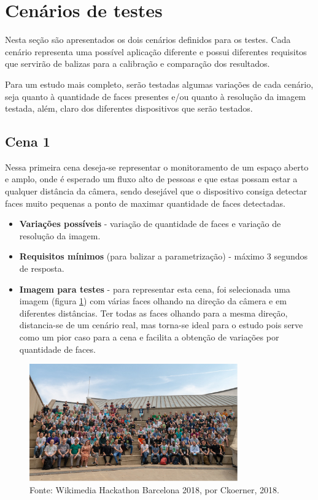 \section{Cenários de testes}

Nesta seção são apresentados os dois cenários definidos para os testes. Cada cenário representa uma possível aplicação diferente e possui diferentes requisitos que servirão de balizas para a calibração e comparação dos resultados.

Para um estudo mais completo, serão testadas algumas variações de cada cenário, seja quanto à quantidade de faces presentes e/ou quanto à resolução da imagem testada, além, claro dos diferentes dispositivos que serão testados.

\subsection{Cena 1}

Nessa primeira cena deseja-se representar o monitoramento de um espaço aberto e amplo, onde é esperado um fluxo alto de pessoas e que estas possam estar a qualquer distância da câmera, sendo desejável que o dispositivo consiga detectar faces muito pequenas a ponto de maximar quantidade de faces detectadas.

\begin{itemize}
    \item \textbf{Variações possíveis} - variação de quantidade de faces e variação de resolução da imagem.
    \item \textbf{Requisitos mínimos} (para balizar a parametrização) - máximo 3 segundos de resposta.
    \item \textbf{Imagem para testes} - para representar esta cena, foi selecionada uma imagem (figura \ref{fig:imagemCena1}) com várias faces olhando na direção da câmera e em diferentes distâncias. Ter todas as faces olhando para a mesma direção, distancia-se de um cenário real, mas torna-se ideal para o estudo pois serve como um pior caso para a cena e facilita a obtenção de variações por quantidade de faces.
\end{itemize}

\begin{figure}[H]
    \centering
    \caption[Imagem selecionada para testes da cena 1.]{Imagem selecionada para testes da cena 1.}
    \includegraphics[width=0.8\textwidth]{Cap3_Desenvolvimento/Figures/imagem_cena1.jpg}
    \caption*{Fonte: Wikimedia Hackathon Barcelona 2018, por Ckoerner, 2018\footnotemark.}
    \label{fig:imagemCena1}
\end{figure}

